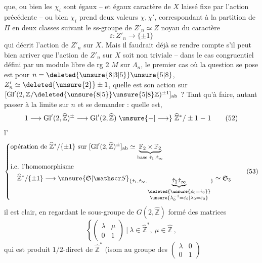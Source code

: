 que, ou bien les $\chi_i$ sont égaux -- et  égaux  caractère de $X$ laissé fixe par l'action précédente -- ou bien $\chi_i$ prend deux valeurs $\chi,\chi'$, correspondant à  la partition de $\Pi$ en deux classes suivant le  ss-groupe de $Z'_n\simeq Z$ noyau du caractère
\[
\varepsilon: Z'_n\longrightarrow\{\pm1\}
\]
qui décrit l'action de $Z'_n$ sur $X$. Mais il faudrait déjà se rendre compte s'il peut bien arriver que l'action de $Z'_n$ sur $X$ soit non triviale -- dans le cas congruentiel défini par  un module libre de rg 2 $M$ sur $\Lambda_n$, le premier cas où la question se pose est pour $n=\deleted{\unsure{8|3|5}}\unsure{5|8}$, $Z'_n\simeq\deleted{\unsure{2}}\pm1$, quelle est son action sur $[\mathrm{Gl}'(2,\mathbb Z/\deleted{\unsure{8|5}}\unsure{5|8}\mathbb Z)^{\pm1}]_{\rm ab}$ ? Tant qu'à faire, autant passer à la limite sur $n$ et se demander : quelle est, 
\[
1\longrightarrow \mathrm{Gl}'(2,\widehat{\mathbb Z})^{\pm}
 \longrightarrow\mathrm{Gl}'(2,\widehat{\mathbb Z})
 \mathrel{\unsure{-|\longrightarrow}}\widehat{\mathbb Z}^{*}/\pm1\mathrel{-}1
\tag*{(52)}
\]
l'
\[
\left\{\begin{aligned}
&\text{opération de }\widehat{\mathbb Z}^{*}/\{\pm1\}\text{ sur }
[\mathrm{Gl}'(2,\widehat{\mathbb Z})^{\pm}]_{\rm ab}
 \simeq\underbrace{\mathbb F_2\times\mathbb F_2}_{\text{base }\dot\tau_1,\dot\tau_\infty}\\
&\text{i.e. l'homomorphisme}\\
&\hspace{1em}\widehat{\mathbb Z}^{*}/\{\pm1\}\longrightarrow
\unsure{\mathfrak S|\mathscr S}_{\{\dot\tau_1,\dot\tau_\infty,
 \underbrace{\dot\tau_1\dot\tau_\infty}_{\substack{\deleted{\unsure{\dot\rho_0=\dot\tau_0}}\\
 \unsure{\dot\lambda_0^{-1}=\dot\varepsilon_0|\dot\lambda_0=\dot\varepsilon_0}}}\}}\simeq\mathfrak S_3
\end{aligned}\right.
\tag*{(53)}
\]
il est clair, en regardant le sous-groupe de $G(2,\widehat{\mathbb Z})$ formé des matrices
\[
\left\{\begin{pmatrix}\lambda&\mu\\0&1\end{pmatrix}\ \bigg|\ 
\lambda\in\widehat{\mathbb Z}^{*},\ \mu\in\widehat{\mathbb Z}\ ,\right.
\]
qui est produit $1/2$-direct de $\widehat{\mathbb Z}^{*}$  (isom au groupe des $\left(\begin{smallmatrix}\lambda&0\\0&1\end{smallmatrix}\right)$
